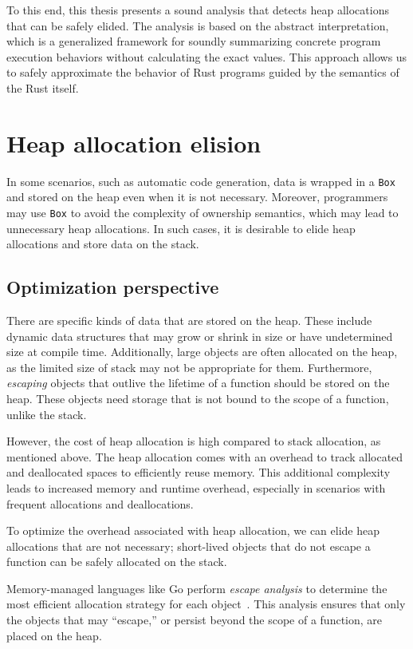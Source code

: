 \documentclass[en]{snu-ece-bsc-thesis}
\theoremstyle{definition}
\begin{document}
To this end, this thesis presents a sound analysis that detects heap allocations that can be safely elided.
The analysis is based on the abstract interpretation, which is a generalized framework for soundly summarizing concrete program execution behaviors without calculating the exact values.
This approach allows us to safely approximate the behavior of Rust programs guided by the semantics of the Rust itself.


\section{Heap allocation elision}
In some scenarios, such as automatic code generation, data is wrapped in a \verb/Box/ and stored on the heap even when it is not necessary.
Moreover, programmers may use \verb/Box/ to avoid the complexity of ownership semantics, which may lead to unnecessary heap allocations.
In such cases, it is desirable to elide heap allocations and store data on the stack.

\subsection{Optimization perspective}
There are specific kinds of data that are stored on the heap.
These include dynamic data structures that may grow or shrink in size or have undetermined size at compile time.
Additionally, large objects are often allocated on the heap, as the limited size of stack may not be appropriate for them.
Furthermore, \emph{escaping} objects that outlive the lifetime of a function should be stored on the heap.
These objects need storage that is not bound to the scope of a function, unlike the stack.

However, the cost of heap allocation is high compared to stack allocation, as mentioned above.
The heap allocation comes with an overhead to track allocated and deallocated spaces to efficiently reuse memory.
This additional complexity leads to increased memory and runtime overhead, especially in scenarios with frequent allocations and deallocations.

To optimize the overhead associated with heap allocation, we can elide heap allocations that are not necessary;
short-lived objects that do not escape a function can be safely allocated on the stack.

Memory-managed languages like Go perform \emph{escape analysis} to determine the most efficient allocation strategy for each object~\cite{gobook}.
This analysis ensures that only the objects that may ``escape,'' or persist beyond the scope of a function, are placed on the heap.
\end{document}
